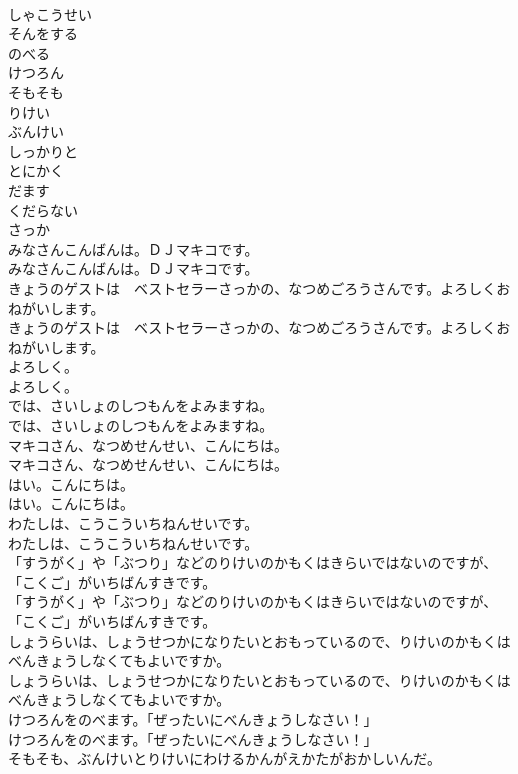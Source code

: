 \documentclass[8pt]{extreport}
\begin{document}
\begin{CJK}{UTF8}{min}
\\	しゃこうせい
\\	そんをする
\\	のべる
\\	けつろん
\\	そもそも
\\	りけい
\\	ぶんけい
\\	しっかりと
\\	とにかく
\\	だます
\\	くだらない
\\	さっか
\\	みなさんこんばんは。ＤＪマキコです。
\\	みなさんこんばんは。ＤＪマキコです。
\\	きょうのゲストは　ベストセラーさっかの、なつめごろうさんです。よろしくおねがいします。
\\	きょうのゲストは　ベストセラーさっかの、なつめごろうさんです。よろしくおねがいします。
\\	よろしく。
\\	よろしく。
\\	では、さいしょのしつもんをよみますね。
\\	では、さいしょのしつもんをよみますね。
\\	マキコさん、なつめせんせい、こんにちは。
\\	マキコさん、なつめせんせい、こんにちは。
\\	はい。こんにちは。
\\	はい。こんにちは。
\\	わたしは、こうこういちねんせいです。
\\	わたしは、こうこういちねんせいです。
\\	「すうがく」や「ぶつり」などのりけいのかもくはきらいではないのですが、「こくご」がいちばんすきです。
\\	「すうがく」や「ぶつり」などのりけいのかもくはきらいではないのですが、「こくご」がいちばんすきです。
\\	しょうらいは、しょうせつかになりたいとおもっているので、りけいのかもくはべんきょうしなくてもよいですか。
\\	しょうらいは、しょうせつかになりたいとおもっているので、りけいのかもくはべんきょうしなくてもよいですか。
\\	けつろんをのべます。「ぜったいにべんきょうしなさい！」
\\	けつろんをのべます。「ぜったいにべんきょうしなさい！」
\\	そもそも、ぶんけいとりけいにわけるかんがえかたがおかしいんだ。

\end{CJK}
\end{document}
